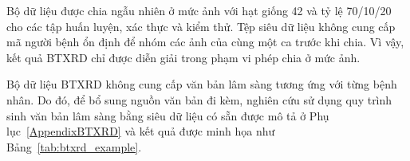 \begin{table}[htbp]
\centering
\small
{}
\caption{Phân bổ các lớp đơn nhãn sau chuẩn hóa trong bộ dữ liệu BTXRD}
\label{tab:btxrd_pathologies}
\end{table}

\clearpage

Bộ dữ liệu được chia ngẫu nhiên ở mức ảnh với hạt giống 42 và tỷ lệ 70/10/20 cho các tập huấn luyện, xác thực và kiểm thử. Tệp siêu dữ liệu không cung cấp mã người bệnh ổn định để nhóm các ảnh của cùng một ca trước khi chia. Vì vậy, kết quả BTXRD chỉ được diễn giải trong phạm vi phép chia ở mức ảnh.

Bộ dữ liệu BTXRD không cung cấp văn bản lâm sàng tương ứng với từng bệnh nhân. Do đó, để bổ sung nguồn văn bản đi kèm, nghiên cứu sử dụng quy trình sinh văn bản lâm sàng bằng siêu dữ liệu có sẵn được mô tả ở Phụ lục~\ref{AppendixBTXRD} và kết quả được minh họa như Bảng~\ref{tab:btxrd_example}.

